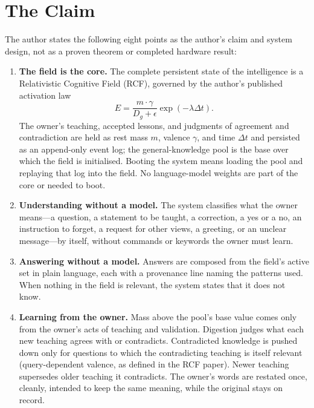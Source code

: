 \documentclass[11pt]{article}
\theoremstyle{remark}
\newcommand{\act}{E}
\newcommand{\dist}{D_g}
\begin{document}
\section{The Claim}

The author states the following eight points as the author's claim and system design, not as a proven theorem or completed hardware result:

\begin{enumerate}
\item \textbf{The field is the core.} The complete persistent state of the intelligence is a Relativistic Cognitive Field (RCF), governed by the author's published activation law
\begin{equation}
\act = \frac{m \cdot \gamma}{\dist + \epsilon} \exp(-\lambda \Delta t).
\end{equation}
The owner's teaching, accepted lessons, and judgments of agreement and contradiction are held as rest mass $m$, valence $\gamma$, and time $\Delta t$ and persisted as an append-only event log; the general-knowledge pool is the base over which the field is initialised. Booting the system means loading the pool and replaying that log into the field. No language-model weights are part of the core or needed to boot.

\item \textbf{Understanding without a model.} The system classifies what the owner means---a question, a statement to be taught, a correction, a yes or a no, an instruction to forget, a request for other views, a greeting, or an unclear message---by itself, without commands or keywords the owner must learn.

\item \textbf{Answering without a model.} Answers are composed from the field's active set in plain language, each with a provenance line naming the patterns used. When nothing in the field is relevant, the system states that it does not know.

\item \textbf{Learning from the owner.} Mass above the pool's base value comes only from the owner's acts of teaching and validation. Digestion judges what each new teaching agrees with or contradicts. Contradicted knowledge is pushed down only for questions to which the contradicting teaching is itself relevant (query-dependent valence, as defined in the RCF paper). Newer teaching supersedes older teaching it contradicts. The owner's words are restated once, cleanly, intended to keep the same meaning, while the original stays on record.


\end{enumerate}
\end{document}
